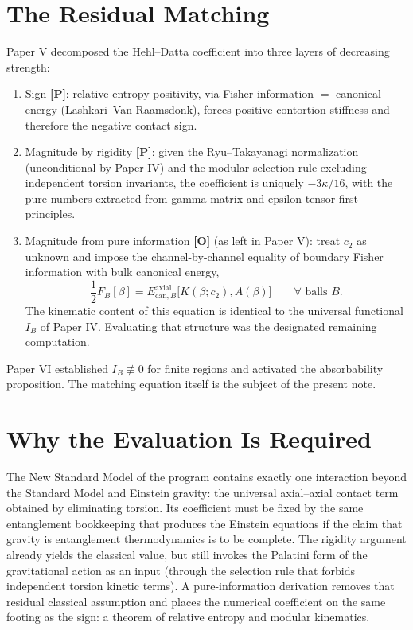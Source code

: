 \documentclass[11pt]{article}
\newcommand{\pP}{\textbf{[P]}}
\newcommand{\pO}{\textbf{[O]}}
\begin{document}
\section{The Residual Matching}
Paper V decomposed the Hehl--Datta coefficient into three layers of
decreasing strength:
\begin{enumerate}[leftmargin=1.6em]
\item Sign \pP{}: relative-entropy positivity, via Fisher information $=$
canonical energy (Lashkari--Van Raamsdonk), forces positive contortion
stiffness and therefore the negative contact sign.
\item Magnitude by rigidity \pP{}: given the Ryu--Takayanagi
normalization (unconditional by Paper IV) and the modular selection
rule excluding independent torsion invariants, the coefficient is
uniquely $-3\kappa/16$, with the pure numbers extracted from
gamma-matrix and epsilon-tensor first principles.
\item Magnitude from pure information \pO{} (as left in Paper V): treat
$c_2$ as unknown and impose the channel-by-channel equality of
boundary Fisher information with bulk canonical energy,
\begin{equation}
\frac12 F_B[\beta]
=
E^{\mathrm{axial}}_{\mathrm{can},B}\bigl[K(\beta;c_2),A(\beta)\bigr]
\qquad\forall\text{ balls }B.
\end{equation}
The kinematic content of this equation is identical to the universal
functional $I_B$ of Paper IV. Evaluating that structure was the
designated remaining computation.
\end{enumerate}
Paper VI established $I_B\not\equiv 0$ for finite regions and activated
the absorbability proposition. The matching equation itself is the
subject of the present note.

\section{Why the Evaluation Is Required}
The New Standard Model of the program contains exactly one interaction
beyond the Standard Model and Einstein gravity: the universal
axial--axial contact term obtained by eliminating torsion. Its
coefficient must be fixed by the same entanglement bookkeeping that
produces the Einstein equations if the claim that gravity is
entanglement thermodynamics is to be complete. The rigidity argument
already yields the classical value, but still invokes the Palatini form
of the gravitational action as an input (through the selection rule
that forbids independent torsion kinetic terms). A pure-information
derivation removes that residual classical assumption and places the
numerical coefficient on the same footing as the sign: a theorem of
relative entropy and modular kinematics.
\end{document}
